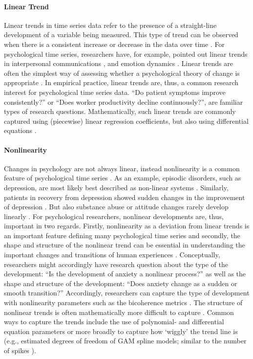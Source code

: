 \documentclass[man, 12pt, a4paper, mask, floatsintext]{apa7}
\theoremstyle{break}
\theoremstyle{plain}
\begin{document}
\paragraph{Linear Trend} Linear trends in time series data refer to the presence of a straight-line development of a variable being measured. This type of trend can be observed when there is a consistent increase or decrease in the data over time \citep{nyblom1986}. For psychological time series, researchers have, for example, pointed out linear trends in interpersonal communications \citep{vasileiadou2014}, and emotion dynamics \citep{oravecz2016}. Linear trends are often the simplest way of assessing whether a psychological theory of change is appropriate \citep{gottman1969}. In empirical practice, linear trends are, thus, a common research interest for psychological time series data. ``Do patient symptoms improve consistently?'' or ``Does worker productivity decline continuously?'', are familiar types of research questions. Mathematically, such linear trends are commonly captured using (piecewise) linear regression coefficients, but also using differential equations \citep{chow2019}. 

\paragraph{Nonlinearity} Changes in psychology are not always linear, instead nonlinearity is a common feature of psychological time series \citep{hayes2007}. As an example, episodic disorders, such as depression, are most likely best described as non-linear systems \citep{hosenfeld2015}. Similarly, patients in recovery from depression showed sudden changes in the improvement of depression \citep{helmich2020a}. But also substance abuse \citep{boker1998} or attitude changes rarely develop linearly \citep{vandermaas2003}. For psychological researchers, nonlinear developments are, thus, important in two regards. Firstly, nonlinearity as a deviation from linear trends is an important feature defining many psychological time series and secondly, the shape and structure of the nonlinear trend can be essential in understanding the important changes and transitions of human experiences \citep{chow2019}. Conceptually, researchers might accordingly have research question about the type of the development: ``Is the development of anxiety a nonlinear process?'' as well as the shape and structure of the development: ``Does anxiety change as a sudden or smooth transition?'' Accordingly, researchers can capture the type of development with nonlinearity parameters such as the bicoherence metrics \citep{cuddy2009}. The structure of nonlinear trends is often mathematically more difficult to capture \citep{castro-alvarez2022a}. Common ways to capture the trends include the use of polynomial- and differential equation parameters or more broadly to capture how `wiggly' the trend line is (e.g., estimated degrees of freedom of GAM spline models; similar to the number of spikes \citealp[]{caro-martin2018}). 
\end{document}

